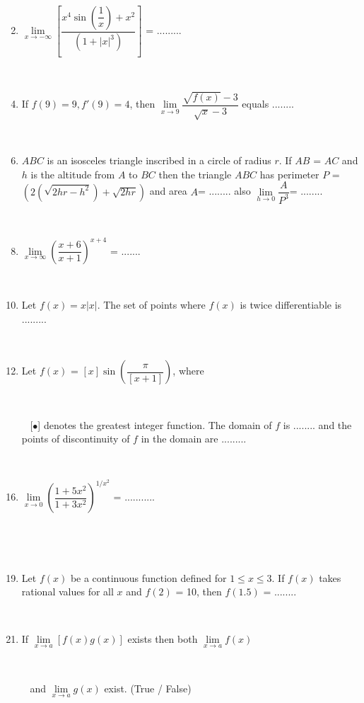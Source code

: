 \documentclass[journal,12pt,twocolumn]{IEEEtran}
\begin{document}
\begin{enumerate}
\item[~]\item $\lim\limits_{x \to -\infty}\left[\dfrac{x^4\sin \left(\dfrac{1}{x}\right)+x^2}{\left(1+|x|^3\right)}\right]$ = .........

\item[~]\item If $f(9)=9, f'(9)=4$, then $\lim\limits_{x \to 9} \dfrac{\sqrt{f(x)}-3}{\sqrt{x}-3}$ equals ........

\item[~]\item $ABC$ is an isosceles triangle inscribed in a circle of radius $r$. If $AB$ = $AC$ and $h$ is the altitude from $A$ to $BC$ then the triangle $ABC$ has perimeter $P$ = $\left(2\left(\sqrt{2hr-h^2}\right)+\sqrt{2hr}\right)$ and area $A$= ........ also $\lim\limits_{h \to 0}\dfrac{A}{P^3}$= ........

\item[~]\item $\lim\limits_{x \to \infty}\left(\dfrac{x+6}{x+1}\right)^{x+4}$ = .......

\item[~] \item Let $f(x)=x|x|$. The set of points where $f(x)$ is twice differentiable is .........

\item[~] \item Let $f(x)$ = $\left[x\right]\sin\left(\dfrac{\pi}{\left[x+1\right]}\right)$, where \item[~]\item[~][$\bullet$] denotes the greatest integer function. The domain of $f$ is ........ and the points of discontinuity of $f$ in the domain are .........

\item[~] \item$\lim\limits_{x \to 0}\left(\dfrac{1+5x^2}{1+3x^2}\right)^{1/x^2}$ = ...........

\item[~] \item[~]\item Let $f(x)$ be a continuous function defined for $1\leq x\leq 3$. If $f(x)$ takes rational values for all $x$ and $f(2)$ = 10, then $f(1.5)$ = ........ 

\item[~] \item If $\lim\limits_{x \to a}\left[f(x)g(x)\right]$ exists then both $\lim\limits_{x \to a}f(x)$ \item[~] \item[~]and $\lim\limits_{x \to a}g(x)$ exist. (True / False)


\end{enumerate}
\end{document}
